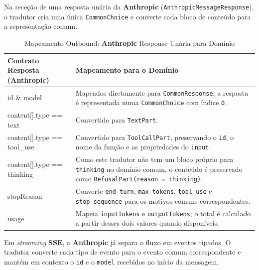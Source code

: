 Na receção de uma resposta unária da \textbf{Anthropic} (\texttt{Anthropic\allowbreak{}Message\allowbreak{}Response}), o tradutor cria uma única \texttt{CommonChoice} e converte cada bloco de conteúdo para a representação comum.

    \begin{table}[H]
        \centering
        \footnotesize
        \renewcommand{\arraystretch}{1.25}
        \begin{tabularx}{\textwidth}{|>{\ttfamily\raggedright\arraybackslash}p{4cm}|Y|}
            \hline
            \textbf{Contrato Resposta (Anthropic)} & \textbf{Mapeamento para o Domínio} \\
            \hline
            id \& model & Mapeados diretamente para \texttt{CommonResponse}; a resposta é representada numa \texttt{CommonChoice} com índice \texttt{0}. \\
            \hline
            content[].type == text & Convertido para \texttt{TextPart}. \\
            \hline
            content[].type == tool\_use & Convertido para \texttt{ToolCallPart}, preservando o \texttt{id}, o nome da função e as propriedades do \texttt{input}. \\
            \hline
            content[].type == thinking & Como este tradutor não tem um bloco próprio para \texttt{thinking} no domínio comum, o conteúdo é preservado como \texttt{RefusalPart(reason = thinking)}. \\
            \hline
            stopReason & Converte \texttt{end\_turn}, \texttt{max\_tokens}, \texttt{tool\_use} e \texttt{stop\_sequence} para os motivos comuns correspondentes. \\
            \hline
            usage & Mapeia \texttt{inputTokens} e \texttt{outputTokens}; o total é calculado a partir desses dois valores quando disponíveis. \\
            \hline
        \end{tabularx}
        \caption{Mapeamento Outbound: \textbf{Anthropic} Response Unária para Domínio}
    \end{table}

    Em \textit{streaming} \textbf{SSE}, a \textbf{Anthropic} já separa o fluxo em eventos tipados. O tradutor converte cada tipo de evento para o evento comum correspondente e mantém em contexto o \texttt{id} e o \texttt{model} recebidos no início da mensagem.

